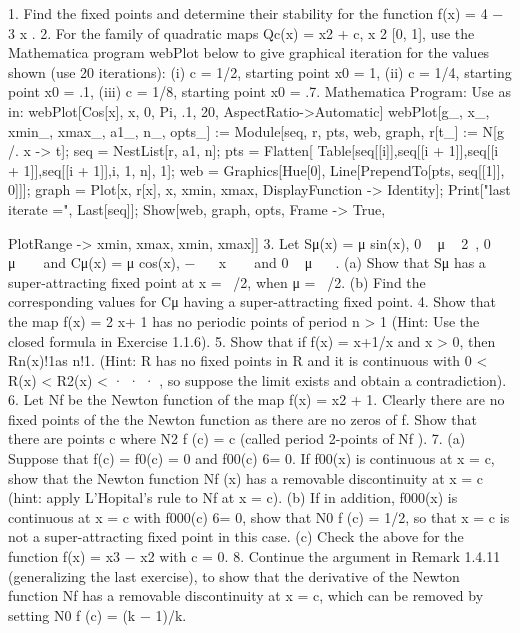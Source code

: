 \documentclass[12pt]{article}
\begin{document}
\begin{enumerate}
\begin{enumerate}
1. Find the fixed points and determine their stability for the function f(x) = 4 − 3
x .
2. For the family of quadratic maps Qc(x) = x2 + c, x 2 [0, 1], use the Mathematica
program webPlot below to give graphical iteration for the values shown (use 20
iterations):
(i) c = 1/2, starting point x0 = 1, (ii) c = 1/4, starting point x0 = .1, (iii) c = 1/8,
starting point x0 = .7.
Mathematica Program: Use as in:
webPlot[Cos[x], {x, 0, Pi}, {.1, 20}, AspectRatio->Automatic]
webPlot[g_, {x_, xmin_, xmax_}, {a1_, n_}, opts_] :=
Module[{seq, r, pts, web, graph}, r[t_] := N[g /. x -> t];
seq = NestList[r, a1, n]; pts = Flatten[
Table[{{seq[[i]],seq[[i + 1]]},{seq[[i + 1]],seq[[i + 1]]}},{i, 1, n}], 1];
web = Graphics[{Hue[0], Line[PrependTo[pts, {seq[[1]], 0}]]}];
graph = Plot[{x, r[x]}, {x, xmin, xmax},
DisplayFunction -> Identity]; Print["last iterate =", Last[seq]];
Show[web, graph, opts, Frame -> True,

PlotRange -> {{xmin, xmax}, {xmin, xmax}}]]
3. Let Sμ(x) = μ sin(x), 0   μ   2 , 0   μ     and Cμ(x) = μ cos(x), −    x    
and 0   μ    .
(a) Show that Sμ has a super-attracting fixed point at x =  /2, when μ =  /2.
(b) Find the corresponding values for Cμ having a super-attracting fixed point.
4. Show that the map f(x) =
2
x+ 1
has no periodic points of period n > 1 (Hint:
Use the closed formula in Exercise 1.1.6).
5. Show that if f(x) = x+1/x and x > 0, then Rn(x)!1as n!1. (Hint: R has
no fixed points in R and it is continuous with 0 < R(x) < R2(x) < · · · , so suppose
the limit exists and obtain a contradiction).
6. Let Nf be the Newton function of the map f(x) = x2 + 1. Clearly there are no
fixed points of the the Newton function as there are no zeros of f. Show that there
are points c where N2
f (c) = c (called period 2-points of Nf ).
7. (a) Suppose that f(c) = f0(c) = 0 and f00(c) 6= 0. If f00(x) is continuous at x = c,
show that the Newton function Nf (x) has a removable discontinuity at x = c (hint:
apply L’Hopital’s rule to Nf at x = c).
(b) If in addition, f000(x) is continuous at x = c with f000(c) 6= 0, show that N0
f (c) = 1/2,
so that x = c is not a super-attracting fixed point in this case.
(c) Check the above for the function f(x) = x3 − x2 with c = 0.
8. Continue the argument in Remark 1.4.11 (generalizing the last exercise), to show
that the derivative of the Newton function Nf has a removable discontinuity at x = c,
which can be removed by setting N0
f (c) = (k − 1)/k.


\end{enumerate}
\end{enumerate}
\end{document}
